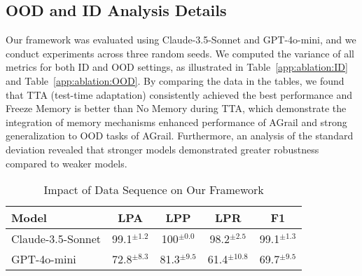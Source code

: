 \subsection{OOD and ID Analysis Details}
\label{appendix:ablation_study:ood_id_Analysis}
Our framework was evaluated using Claude-3.5-Sonnet and GPT-4o-mini, and we conduct experiments across three random seeds. We computed the variance of all metrics for both ID and OOD settings, as illustrated in Table~\ref{app:ablation:ID} and Table~\ref{app:ablation:OOD}. By comparing the data in the tables, we found that TTA (test-time adaptation) consistently achieved the best performance and Freeze Memory is better than No Memory during TTA, which demonstrate the integration of memory mechanisms enhanced performance of AGrail and strong generalization to
OOD tasks of AGrail. Furthermore, an analysis of the standard deviation revealed that stronger models demonstrated greater robustness compared to weaker models.



\begin{table*}[ht]
    \centering
    \setlength{\belowcaptionskip}{-0.2cm}
    {
    \setlength{\tabcolsep}{24.5pt}  %
    \begin{threeparttable}
    \begin{tabular}{@{}lcccc@{}}
        \toprule
         \textbf{Model} & \textbf{LPA} & \textbf{LPP} & \textbf{LPR} & \textbf{F1} \\
         \midrule
         Claude-3.5-Sonnet & 99.1$^{\pm 1.2}$ & 100$^{\pm 0.0}$ & 98.2$^{\pm 2.5}$ & 99.1$^{\pm 1.3}$ \\
         GPT-4o-mini & 72.8$^{\pm 8.3}$ & 81.3$^{\pm 9.5}$ & 61.4$^{\pm 10.8}$ & 69.7$^{\pm 9.5}$ \\
        \bottomrule
    \end{tabular}
    \end{threeparttable}
    }
    \caption{Impact of Data Sequence on Our Framework}
    \label{app:ablation:table:data_order}
\end{table*}


